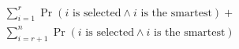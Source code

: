 \documentclass[preview]{standalone}
\begin{document}
\begin{align*}
\sum_{i=1}^{r} \Pr(i \text{ is selected} \land i \text{ is the smartest}) + \\ \sum_{i=r+1}^{n} \Pr(i \text{ is selected} \land i \text{ is the smartest})
\end{align*}
\end{document}
